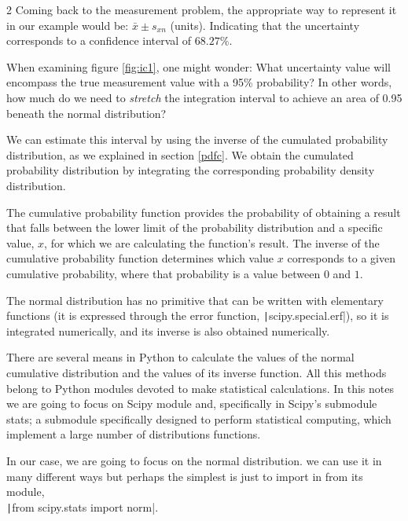 \begin{paracol}{2}
Coming back to the measurement problem, the appropriate way to represent it in our example would be: $\bar{x}\pm s_{xn}$ (units). Indicating that the uncertainty corresponds to a confidence interval of $68.27\%$.

When examining figure \ref{fig:ic1}, one might wonder: What uncertainty value will encompass the true measurement value with a 95\% probability? In other words, how much do we need to \emph{stretch} the integration interval to achieve an area of 0.95 beneath the normal distribution?

We can estimate this interval by using the inverse of the cumulated probability distribution, as we explained in section \ref{pdfc}. We obtain the cumulated probability distribution by integrating the corresponding probability density distribution.     

The cumulative probability function provides the probability of obtaining a result that falls between the lower limit of the probability distribution and a specific value, $x$, for which we are calculating the function's result. The inverse of the cumulative probability function determines which value $x$ corresponds to a given cumulative probability, where that probability is a value between $0$ and $1$.

The normal distribution has no primitive that can be written with elementary functions (it is expressed through the error function, \texttt|scipy.special.erf|), so it is integrated numerically, and its inverse is also obtained numerically.

There are several means in Python to calculate the values of the normal cumulative distribution and the values of its inverse function. All this methods belong to Python modules devoted to make statistical calculations. In this notes we are going to focus on Scipy module and, specifically in Scipy's submodule stats; a submodule specifically designed to perform statistical computing, which implement a large number of distributions functions.

In our case, we are going to focus on the normal distribution. we can use it in many different ways but perhaps the simplest is just to import in from its module,\\ \texttt|from scipy.stats import norm|.


\end{paracol}
